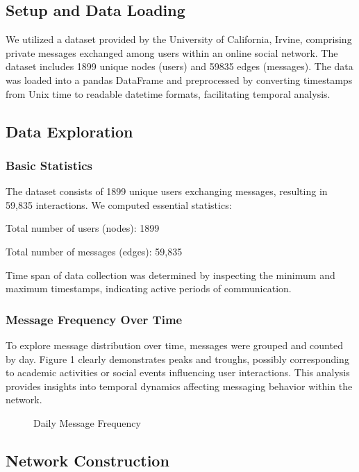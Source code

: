 
\subsection{Setup and Data Loading}
We utilized a dataset provided by the University of California, Irvine, comprising private messages exchanged among users within an online social network. The dataset includes 1899 unique nodes (users) and 59835 edges (messages). The data was loaded into a pandas DataFrame and preprocessed by converting timestamps from Unix time to readable datetime formats, facilitating temporal analysis.

\subsection{Data Exploration}

\subsubsection{Basic Statistics}
The dataset consists of 1899 unique users exchanging messages, resulting in 59,835 interactions. We computed essential statistics:

Total number of users (nodes): 1899

Total number of messages (edges): 59,835

Time span of data collection was determined by inspecting the minimum and maximum timestamps, indicating active periods of communication.

\subsubsection{Message Frequency Over Time}
To explore message distribution over time, messages were grouped and counted by day. Figure 1 clearly demonstrates peaks and troughs, possibly corresponding to academic activities or social events influencing user interactions. This analysis provides insights into temporal dynamics affecting messaging behavior within the network.

\begin{figure}[h]
\centering
\caption{Daily Message Frequency}
\label{fig:message_frequency}
\end{figure}

\subsection{Network Construction}

